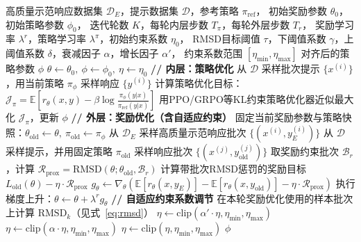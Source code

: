\begin{algorithm}[H]
    \caption{近端逆奖励优化算法（PIRO）}
    \label{alg:piro}
    \small
    \begin{algorithmic}[1]
        \Require 高质量示范响应数据集 $\mathcal{D}_E$，提示数据集 $\mathcal{D}$，参考策略 $\pi_{\mathrm{ref}}$，
                 初始奖励参数 $\theta_0$，初始策略参数 $\phi_0$，
                 迭代轮数 $K$，每轮内层步数 $T_\pi$，每轮外层步数 $T_r$，
                 奖励学习率 $\lambda^r$，策略学习率 $\lambda^\pi$，初始约束系数 $\eta_0$，
                 RMSD目标阈值 $\tau$，下阈值系数 $\gamma$，上阈值系数 $\delta$，衰减因子 $\alpha$，增长因子 $\alpha'$，
                 约束系数范围 $[\eta_{\min},\eta_{\max}]$
        \Ensure 对齐后的策略参数 $\phi$
        \State $\theta \gets \theta_0,\ \phi \gets \phi_0,\ \eta \gets \eta_0$
            \State \textbf{// 内层：策略优化}
                \State 从 $\mathcal{D}$ 采样批次提示 $\{x^{(i)}\}$，用当前策略 $\pi_\phi$ 采样响应 $\{y^{(i)}\}$
                \State 计算策略优化目标：$\mathcal{J}_\pi = \mathbb{E}\left[r_\theta(x,y) - \beta\log\frac{\pi_\phi(y|x)}{\pi_{\mathrm{ref}}(y|x)}\right]$
                \State 用PPO/GRPO等KL约束策略优化器近似最大化 $\mathcal{J}_\pi$，更新 $\phi$
            \EndFor
            \State \textbf{// 外层：奖励优化（含自适应约束）}
            \State 固定当前奖励参数与策略快照：$\theta_{\mathrm{old}} \gets \theta,\ \pi_{\mathrm{old}}\gets\pi_\phi$
                \State 从 $\mathcal{D}_E$ 采样高质量示范响应批次 $\{(x^{(i)}, y_E^{(i)})\}$
                \State 从 $\mathcal{D}$ 采样提示，并用固定策略 $\pi_{\mathrm{old}}$ 采样响应批次 $\{(x^{(j)}, y_{\mathrm{old}}^{(j)})\}$
                \State 取奖励约束批次 $\mathcal{B}_r$，计算 $\mathcal{R}_{\mathrm{prox}}=\mathrm{RMSD}(\theta;\theta_{\mathrm{old}},\mathcal{B}_r)$
                \State 计算带批次RMSD惩罚的奖励目标 $L_{\mathrm{old}}(\theta)-\eta\cdot\mathcal{R}_{\mathrm{prox}}$
                \State $g_\theta \gets \nabla_\theta\left(\mathbb{E}[r_\theta(x,y_E)]-\mathbb{E}[r_\theta(x,y_{\mathrm{old}})]-\eta\cdot\mathcal{R}_{\mathrm{prox}}\right)$
                \State 执行梯度上升：$\theta \gets \theta + \lambda^r g_\theta$
            \EndFor
            \State \textbf{// 自适应约束系数调节}
            \State 在本轮奖励优化使用的样本批次上计算 $\mathrm{RMSD}_k$（见式~\eqref{eq:rmsd}）
                \State $\eta \gets \mathrm{clip}(\alpha' \cdot \eta,\eta_{\min},\eta_{\max})$
                \State $\eta \gets \mathrm{clip}(\alpha \cdot \eta,\eta_{\min},\eta_{\max})$
            \Else
                \State $\eta \gets \mathrm{clip}(\eta,\eta_{\min},\eta_{\max})$
            \EndIf
        \EndFor
        \State \Return $\phi$
    \end{algorithmic}
\end{algorithm}

